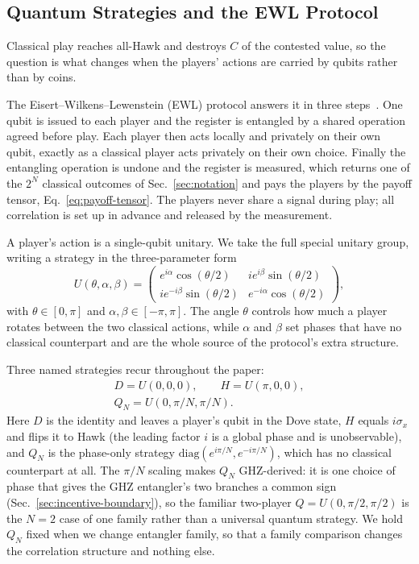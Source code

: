 \documentclass[conference,letterpaper,10pt]{IEEEtran}
\begin{document}
\subsection{Quantum Strategies and the EWL Protocol}
\label{sec:ewl}
Classical play reaches all-Hawk and destroys $C$ of the contested value, so the
question is what changes when the players' actions are carried by qubits rather
than by coins.

The Eisert--Wilkens--Lewenstein (EWL) protocol answers it in three
steps~\cite{eisert1999}. One qubit is issued to each player and the register is
entangled by a shared operation agreed before play. Each player then acts
locally and privately on their own qubit, exactly as a classical player acts
privately on their own choice. Finally the entangling operation is undone and
the register is measured, which returns one of the $2^N$ classical outcomes
of Sec.~\ref{sec:notation} and pays the players by the payoff tensor,
Eq.~\eqref{eq:payoff-tensor}. The players never share a signal during play; all
correlation is set up in advance and released by the measurement.

A player's action is a single-qubit unitary. We take the full special unitary
group, writing a strategy in the three-parameter form
\begin{equation}
U(\theta,\alpha,\beta)=
\begin{pmatrix}
e^{i\alpha}\cos(\theta/2) & i e^{i\beta}\sin(\theta/2)\\
i e^{-i\beta}\sin(\theta/2) & e^{-i\alpha}\cos(\theta/2)
\end{pmatrix},
\label{eq:strategy-unitary}
\end{equation}
with $\theta\in[0,\pi]$ and $\alpha,\beta\in[-\pi,\pi]$. The angle $\theta$
controls how much a player rotates between the two classical actions, while
$\alpha$ and $\beta$ set phases that have no classical counterpart and are the
whole source of the protocol's extra structure.

Three named strategies recur throughout the paper:
\begin{equation}
\begin{gathered}
D=U(0,0,0),\qquad H=U(\pi,0,0),\\
Q_N=U(0,\pi/N,\pi/N).
\end{gathered}
\label{eq:named-strategies}
\end{equation}
Here $D$ is the identity and leaves a player's qubit in the Dove state, $H$
equals $i\sigma_x$ and flips it to Hawk (the leading factor $i$ is a global
phase and is unobservable), and $Q_N$ is the phase-only strategy
$\mathrm{diag}(e^{i\pi/N},e^{-i\pi/N})$, which has no classical counterpart at
all. The $\pi/N$ scaling makes $Q_N$ GHZ-derived: it is one choice of phase that gives the GHZ
entangler's two branches a common sign (Sec.~\ref{sec:incentive-boundary}), so the familiar two-player $Q=U(0,\pi/2,\pi/2)$
is the $N=2$ case of one family rather than a universal quantum strategy. We
hold $Q_N$ fixed when we change entangler family, so that a family comparison
changes the correlation structure and nothing else.
\end{document}
